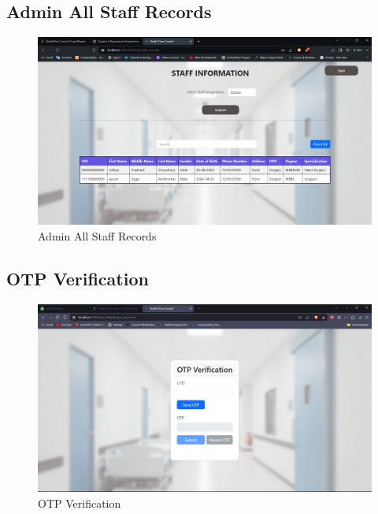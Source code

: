 \subsection{Admin All Staff Records}
\begin{figure}[h!]
    \centering
    \includegraphics[width=\textwidth]{Admin_all_staff_records.png}
    \caption{Admin All Staff Records}
\end{figure}
\subsection{OTP Verification}
\begin{figure}[h!]
    \centering
    \includegraphics[width=\textwidth]{OTP_verification.png}
    \caption{OTP Verification}
\end{figure}

\clearpage
